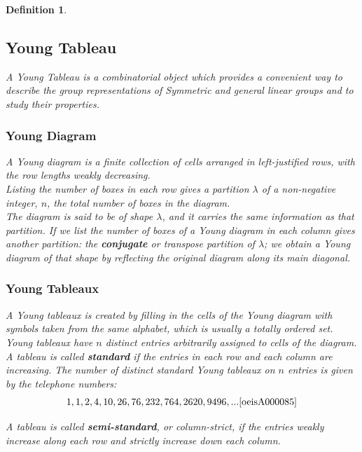 \documentclass[12pt]{article}
\newtheorem{definition}{Definition}
\begin{document}
\begin{definition}
\subsection{Young Tableau}
A Young Tableau is a combinatorial object which provides a convenient way to describe the group representations of Symmetric and general linear groups and to study their properties.

\subsubsection{Young Diagram}
A Young diagram is a finite collection of cells arranged in left-justified rows, with the row lengths weakly decreasing.\\
Listing the number of boxes in each row gives a partition $\lambda$ of a non-negative integer, $n$, the total number of boxes in the diagram.\\
The diagram is said to be of shape $\lambda$, and it carries the same information as that partition. If we list the number of boxes of a Young diagram in each column gives another partition: the {\bf conjugate} or {\it transpose} partition of $\lambda$; we obtain a Young diagram of that shape by reflecting the original diagram along its main diagonal.

\subsubsection{Young Tableaux}
A Young tableaux is created by filling in the cells of the Young diagram with symbols taken from the same alphabet, which is usually a totally ordered set. Young tableaux have $n$ distinct entries arbitrarily assigned to cells of the diagram.\\
A tableau is called {\bf standard} if the entries in each row and each column are increasing. The number of distinct standard Young tableaux on $n$ entries is given by the telephone numbers:\\
\begin{equation}
\begin{split}
& 1, 1, 2, 4, 10, 26, 76, 232, 764, 2620, 9496, ... \cite{oeisA000085}\\
\end{split}
\end{equation}

A tableau is called {\bf semi-standard}, or {\it column-strict}, if the entries weakly increase along each row and strictly increase down each column.\\


\end{definition}
\end{document}
